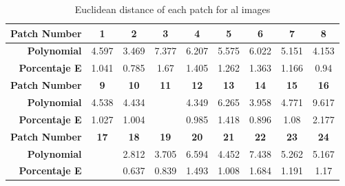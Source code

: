 \begin{table}[H]
  \caption{Euclidean distance of each patch for al images }
  \begin{center}
    \begin{tabularx}{\textwidth}{r c c c c c c c c}
    \toprule
        \textbf{Patch Number} & \textbf{1} & \textbf{2} & \textbf{3} & \textbf{4} & \textbf{5} & \textbf{6} & \textbf{7} & \textbf{8}\\ \midrule 
        \textbf{Polynomial} &4.597 &3.469 &7.377 &6.207 &5.575 &6.022 &5.151 &4.153\\ 
        \textbf{Porcentaje E} &1.041 &0.785 &1.67 &1.405 &1.262 &1.363 &1.166 &0.94\\ \midrule 
        \textbf{Patch Number} & \textbf{9} & \textbf{10} & \textbf{11} & \textbf{12} & \textbf{13} & \textbf{14} & \textbf{15} & \textbf{16}\\ \midrule 
        \textbf{Polynomial} &4.538 &4.434 &\cellcolor{colorred}{12.564} &4.349 &6.265 &3.958 &4.771 &9.617\\ 
        \textbf{Porcentaje E} &1.027 &1.004 &\cellcolor{colorred}{2.845} &0.985 &1.418 &0.896 &1.08 &2.177\\ \midrule 
        \textbf{Patch Number} & \textbf{17} & \textbf{18} & \textbf{19} & \textbf{20} & \textbf{21} & \textbf{22} & \textbf{23} & \textbf{24}\\ \midrule 
        \textbf{Polynomial} &\cellcolor{colorgreen}{2.576} &2.812 &3.705 &6.594 &4.452 &7.438 &5.262 &5.167\\ 
        \textbf{Porcentaje E} &\cellcolor{colorgreen}{0.583} &0.637 &0.839 &1.493 &1.008 &1.684 &1.191 &1.17\\ \midrule 
    \bottomrule
    \end{tabularx}
  \end{center}
\end{table}
